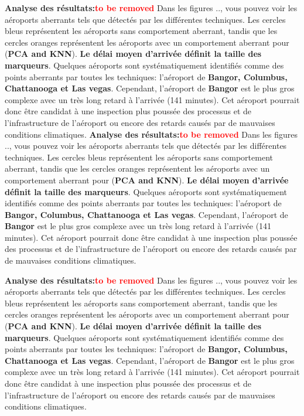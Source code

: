 \noindent\textbf{Analyse des résultats:\textcolor{red}{to be removed}} 
Dans les figures .., vous pouvez voir les aéroports aberrants tels que détectés par les différentes techniques. Les cercles bleus représentent les aéroports sans comportement aberrant, tandis que les cercles oranges représentent les aéroports avec un comportement aberrant pour (\textbf{PCA and KNN}). \textbf{Le délai moyen d'arrivée définit la taille des marqueurs}. Quelques aéroports sont systématiquement identifiés comme des points aberrants par toutes les techniques: l’aéroport de \textbf{Bangor, Columbus, Chattanooga et Las vegas}. Cependant, l’aéroport de \textbf{Bangor} est le plus gros complexe avec un très long retard à l’arrivée (141 minutes). Cet aéroport pourrait donc être candidat à une inspection plus poussée des processus et de l’infrastructure de l’aéroport ou encore des retards causés par de mauvaises conditions climatiques.
\noindent\textbf{Analyse des résultats:\textcolor{red}{to be removed}} 
Dans les figures .., vous pouvez voir les aéroports aberrants tels que détectés par les différentes techniques. Les cercles bleus représentent les aéroports sans comportement aberrant, tandis que les cercles oranges représentent les aéroports avec un comportement aberrant pour (\textbf{PCA and KNN}). \textbf{Le délai moyen d'arrivée définit la taille des marqueurs}. Quelques aéroports sont systématiquement identifiés comme des points aberrants par toutes les techniques: l’aéroport de \textbf{Bangor, Columbus, Chattanooga et Las vegas}. Cependant, l’aéroport de \textbf{Bangor} est le plus gros complexe avec un très long retard à l’arrivée (141 minutes). Cet aéroport pourrait donc être candidat à une inspection plus poussée des processus et de l’infrastructure de l’aéroport ou encore des retards causés par de mauvaises conditions climatiques.\newl

\noindent\textbf{Analyse des résultats:\textcolor{red}{to be removed}} 
Dans les figures .., vous pouvez voir les aéroports aberrants tels que détectés par les différentes techniques. Les cercles bleus représentent les aéroports sans comportement aberrant, tandis que les cercles oranges représentent les aéroports avec un comportement aberrant pour (\textbf{PCA and KNN}). \textbf{Le délai moyen d'arrivée définit la taille des marqueurs}. Quelques aéroports sont systématiquement identifiés comme des points aberrants par toutes les techniques: l’aéroport de \textbf{Bangor, Columbus, Chattanooga et Las vegas}. Cependant, l’aéroport de \textbf{Bangor} est le plus gros complexe avec un très long retard à l’arrivée (141 minutes). Cet aéroport pourrait donc être candidat à une inspection plus poussée des processus et de l’infrastructure de l’aéroport ou encore des retards causés par de mauvaises conditions climatiques.\newl

